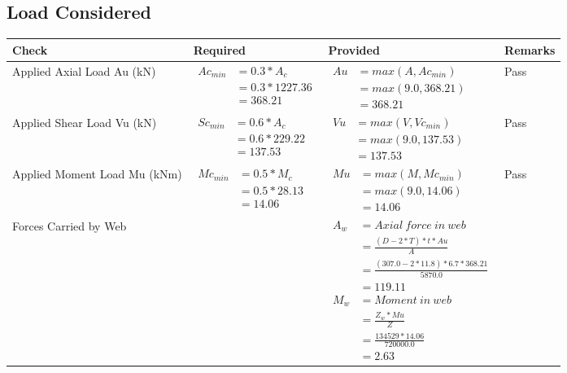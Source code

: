 \documentclass{article}%
\begin{document}
\subsection{Load Considered}%
\label{subsec:LoadConsidered}%
\renewcommand{\arraystretch}{1.2}%
\begin{longtable}{|p{4cm}|p{5cm}|p{5.5cm}|p{1.5cm}|}%
\hline%
\rowcolor{OsdagGreen}%
Check&Required&Provided&Remarks\\%
\hline%
\endhead%
\hline%
Applied Axial Load Au (kN)&$\begin{aligned} Ac_{min} &= 0.3 * A_c\\ &= 0.3 *1227.36\\ &=368.21\end{aligned}$&$\begin{aligned} Au &= max(A,Ac_{min} )\\ &= max( 9.0,368.21)\\ &=368.21\end{aligned}$&Pass\\%
\hline%
Applied Shear Load Vu (kN)&$\begin{aligned} Sc_{min} &= 0.6 * A_c\\ &= 0.6 *229.22\\ &=137.53\end{aligned}$&$\begin{aligned} Vu &= max(V,Vc_{min})\\ &=  max(9.0,137.53)\\ &=137.53\end{aligned}$&Pass\\%
\hline%
Applied Moment Load Mu (kNm)&$\begin{aligned} Mc_{min} &= 0.5 * M_c\\ &= 0.5 *28.13\\ &=14.06\end{aligned}$&$\begin{aligned} Mu &= max(M,Mc_{min} )\\ &= max(9.0,14.06)\\ &=14.06\end{aligned}$&Pass\\%
\hline%
Forces Carried by Web&&$\begin{aligned}A_w &= Axial~ force~ in~ web  \\   &= \frac{(D- 2*T)*t* Au }{A} \\ &= \frac{(307.0- 2*11.8)*6.7*368.21 }{5870.0} \\ &=119.11\\ M_w &= Moment ~in ~web  \\  &= \frac{Z_w * Mu}{Z} \\ &= \frac{134529 * 14.06}{720000.0} \\ &=2.63\end{aligned}$&\\%

\end{longtable}
\end{document}
